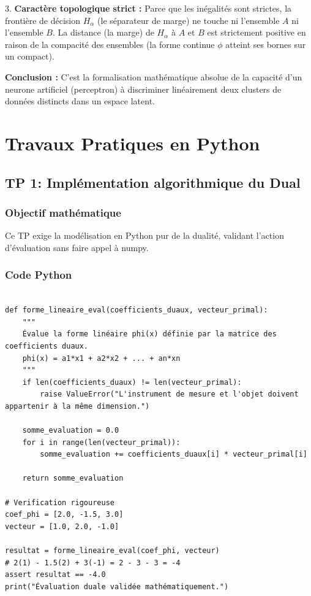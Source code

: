 \documentclass[11pt,a4paper]{report}
\begin{document}
3. \textbf{Caractère topologique strict :}
   Parce que les inégalités sont strictes, la frontière de décision $H_\alpha$ (le séparateur de marge) ne touche ni l'ensemble $A$ ni l'ensemble $B$.
   La distance (la marge) de $H_\alpha$ à $A$ et $B$ est strictement positive en raison de la compacité des ensembles (la forme continue $\phi$ atteint ses bornes sur un compact).

\textbf{Conclusion :}
C'est la formalisation mathématique absolue de la capacité d'un neurone artificiel (perceptron) à discriminer linéairement deux clusters de données distincts dans un espace latent.


\chapter{Travaux Pratiques en Python}
\section{TP 1: Implémentation algorithmique du Dual}

\subsection{Objectif mathématique}
Ce TP exige la modélisation en Python pur de la dualité, validant l'action d'évaluation sans faire appel à numpy.

\subsection{Code Python}
\begin{lstlisting}

def forme_lineaire_eval(coefficients_duaux, vecteur_primal):
    """
    Évalue la forme linéaire phi(x) définie par la matrice des coefficients duaux.
    phi(x) = a1*x1 + a2*x2 + ... + an*xn
    """
    if len(coefficients_duaux) != len(vecteur_primal):
        raise ValueError("L'instrument de mesure et l'objet doivent appartenir à la même dimension.")

    somme_evaluation = 0.0
    for i in range(len(vecteur_primal)):
        somme_evaluation += coefficients_duaux[i] * vecteur_primal[i]

    return somme_evaluation

# Verification rigoureuse
coef_phi = [2.0, -1.5, 3.0]
vecteur = [1.0, 2.0, -1.0]

resultat = forme_lineaire_eval(coef_phi, vecteur)
# 2(1) - 1.5(2) + 3(-1) = 2 - 3 - 3 = -4
assert resultat == -4.0
print("Évaluation duale validée mathématiquement.")
\end{lstlisting}
\end{document}
